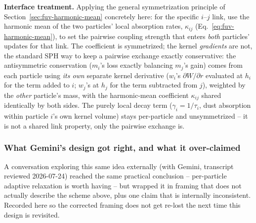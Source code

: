 \textbf{Interface treatment.} Applying the general symmetrization
principle of Section~\ref{sec:fuv-harmonic-mean} concretely here: for
the specific $i$--$j$ link, use the harmonic mean of the two
particles' local absorption rates, $\kappa_{ij}$
(Eq.~\ref{eq:fuv-harmonic-mean}), to set the pairwise coupling
strength that enters \emph{both} particles' updates for that link. The
coefficient is symmetrized; the kernel \emph{gradients} are not, the
standard SPH way to keep a pairwise exchange exactly conservative: the
antisymmetric conservation ($m_i$'s loss exactly balancing $m_j$'s
gain) comes from each particle using \emph{its own} separate kernel
derivative ($w_i$'s $\partial W/\partial r$ evaluated at $h_i$ for the
term added to $i$; $w_j$'s at $h_j$ for the term subtracted from $j$),
weighted by the \emph{other} particle's mass, with the harmonic-mean
coefficient $\kappa_{ij}$ shared identically by both sides.
The purely local decay term ($\gamma_i=1/\tau_i$, dust absorption
within particle $i$'s own kernel volume) stays per-particle and
unsymmetrized -- it is not a shared link property, only the pairwise
exchange is.

\subsubsection{What Gemini's design got right, and what it over-claimed}
\label{sec:fuv-gemini-review}

A conversation exploring this same idea externally (with Gemini,
transcript reviewed 2026-07-24) reached the same practical conclusion --
per-particle adaptive relaxation is worth having -- but wrapped it in
framing that does not actually describe the scheme above, plus one
claim that is internally inconsistent. Recorded here so the corrected
framing does not get re-lost the next time this design is revisited.

